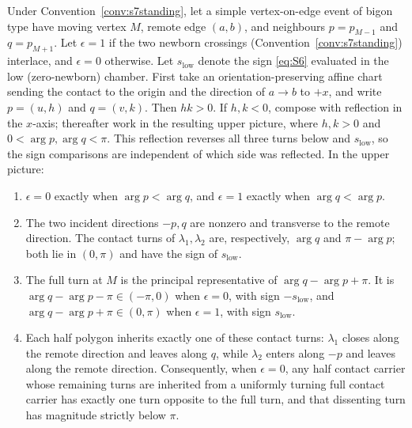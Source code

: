 \begin{lemma}\label{lem:contactturnboth}
Under Convention~\ref{conv:s7standing}, let a simple vertex-on-edge event of
bigon type have moving vertex $M$, remote edge $(a,b)$, and neighbours
$p=p_{M-1}$ and $q=p_{M+1}$.
Let $\epsilon=1$ if the two newborn crossings
(Convention~\ref{conv:s7standing}) interlace, and $\epsilon=0$
otherwise. Let $s_{\mathrm{low}}$ denote the sign \eqref{eq:S6} evaluated in the low
(zero-newborn) chamber. First take an orientation-preserving affine
chart sending the contact to the origin and the direction of $a\to b$ to
$+x$, and write $p=(u,h)$ and $q=(v,k)$. Then $hk>0$. If $h,k<0$,
compose with reflection in the $x$-axis; thereafter work in the resulting
upper picture, where $h,k>0$ and $0<\arg p,\arg q<\pi$. This reflection
reverses all three turns below and $s_{\mathrm{low}}$, so the sign comparisons are
independent of which side was reflected. In the upper picture:
\begin{enumerate}
\item[(i)] $\epsilon=0$ exactly when $\arg p<\arg q$, and $\epsilon=1$
exactly when $\arg q<\arg p$.
\item[(ii)] The two incident directions $-p,q$ are nonzero and transverse to
the remote direction. The contact turns of $\lambda_1,\lambda_2$ are,
respectively, $\arg q$ and $\pi-\arg p$; both lie in $(0,\pi)$ and
have the sign of $s_{\mathrm{low}}$.
\item[(iii)] The full turn at $M$ is the principal representative of
$\arg q-\arg p+\pi$. It is
$\arg q-\arg p-\pi\in(-\pi,0)$ when $\epsilon=0$, with sign
$-s_{\mathrm{low}}$, and $\arg q-\arg p+\pi\in(0,\pi)$ when
$\epsilon=1$, with sign $s_{\mathrm{low}}$.
\item[(iv)] Each half polygon inherits exactly one of these contact turns:
$\lambda_1$ closes along the remote direction and leaves along $q$, while
$\lambda_2$ enters along $-p$ and leaves along the remote direction.
Consequently, when $\epsilon=0$, any half contact carrier whose remaining
turns are inherited from a uniformly turning full contact carrier has exactly
one turn opposite to the full turn, and that dissenting turn has magnitude
strictly below $\pi$.
\end{enumerate}
\end{lemma}
